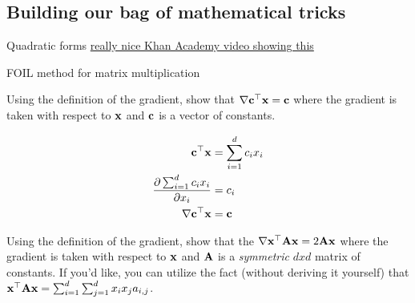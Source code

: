 \documentclass{tufte-handout}
\begin{document}
\subsection{Building our bag of mathematical tricks}

\begin{exercise}[30 minutes]
\bes
\item Quadratic forms \href{https://www.khanacademy.org/math/multivariable-calculus/applications-of-multivariable-derivatives/quadratic-approximations/v/expressing-a-quadratic-form-with-a-matrix}{really nice Khan Academy video showing this}
\item FOIL method for matrix multiplication

\item Using the definition of the gradient, show that $\nabla \mathbf{c}^\top \mathbf{x} = \mathbf{c}$ where the gradient is taken with respect to $\mathbf{x}$ and $\mathbf{c}$ is a vector of constants.


\begin{boxedsolution}

\begin{align}
\mathbf{c}^\top \mathbf{x} &= \sum_{i=1}^d c_i x_i \\
\frac{\partial  \sum_{i=1}^d c_i x_i }{\partial x_i} &= c_i  \\
\nabla \mathbf{c}^\top \mathbf{x} &= \mathbf{c}
\end{align}

\end{boxedsolution}

\fi


\item Using the definition of the gradient, show that the $\nabla \mathbf{x}^\top \mathbf{A} \mathbf{x} = 2 \mathbf{A} \mathbf{x}$ where the gradient is taken with respect to $\mathbf{x}$ and $\mathbf{A}$ is a \emph{symmetric} $dxd$ matrix of constants.  If you'd like, you can utilize the fact (without deriving it yourself) that $\mathbf{x}^\top \mathbf{A} \mathbf{x} = \sum_{i=1}^d\sum_{j=1}^d x_i x_j a_{i, j}$.%
\ees

\begin{boxedsolution}


\end{boxedsolution}
\end{exercise}
\end{document}

